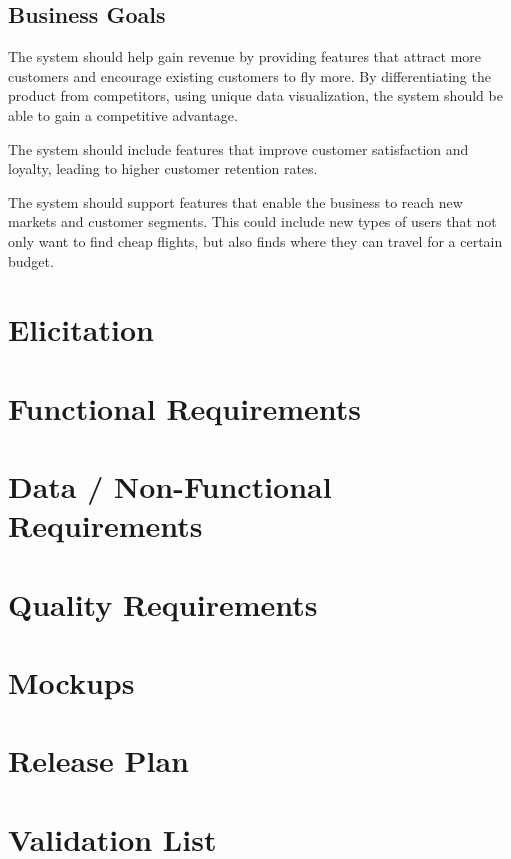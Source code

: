 \documentclass[a4paper]{article}
\begin{document}
\subsection{Business Goals}
The system should help gain revenue by providing features that attract more customers and encourage existing customers to fly more. By differentiating the product from competitors, using unique data visualization, the system should be able to gain a competitive advantage.

The system should include features that improve customer satisfaction and loyalty, leading to higher customer retention rates.

The system should support features that enable the business to reach new markets and customer segments. This could include new types of users that not only want to find cheap flights, but also finds where they can travel for a certain budget.

\section{Elicitation}


\section{Functional Requirements}


\section{Data / Non-Functional Requirements}


\section{Quality Requirements}


\section{Mockups}

\section{Release Plan}


\section{Validation List}

\end{document}
